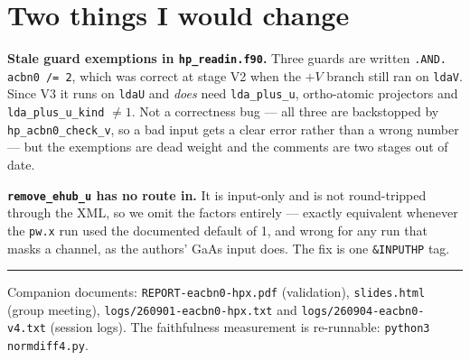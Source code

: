 \documentclass[11pt,a4paper]{article}
\newcommand{\C}[1]{\texttt{\small #1}}
\begin{document}
\section{Two things I would change}

\noindent
\textbf{Stale guard exemptions in \C{hp_readin.f90}.} Three guards are written
\C{.AND. acbn0 /= 2}, which was correct at stage V2 when the $+V$ branch still
ran on \C{ldaV}. Since V3 it runs on \C{ldaU} and \emph{does} need
\C{lda_plus_u}, ortho-atomic projectors and \C{lda_plus_u_kind} $\neq 1$. Not a
correctness bug --- all three are backstopped by \C{hp_acbn0_check_v}, so a bad
input gets a clear error rather than a wrong number --- but the exemptions are
dead weight and the comments are two stages out of date.

\smallskip
\noindent
\textbf{\C{remove_ehub_u} has no route in.} It is input-only and is not
round-tripped through the XML, so we omit the factors entirely --- exactly
equivalent whenever the \C{pw.x} run used the documented default of 1, and
wrong for any run that masks a channel, as the authors' GaAs input does. The fix
is one \C{\&INPUTHP} tag.

\vspace{8pt}
\noindent\textcolor{rule}{\rule{\textwidth}{0.8pt}}
\vspace{2pt}

\noindent\footnotesize\color{mute}
Companion documents: \C{REPORT-eacbn0-hpx.pdf} (validation), \C{slides.html}
(group meeting), \C{logs/260901-eacbn0-hpx.txt} and \C{logs/260904-eacbn0-v4.txt}
(session logs). The faithfulness measurement is re-runnable:
\C{python3 normdiff4.py}.
\end{document}
